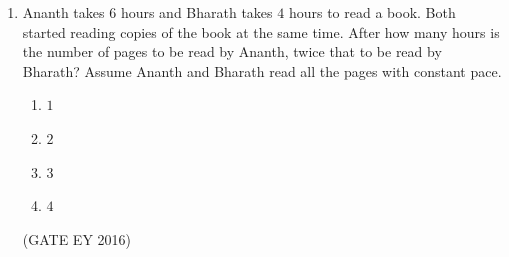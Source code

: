 \documentclass[journal]{IEEEtran}
\begin{document}
\begin{enumerate}[label=Q.\arabic*.]
\item Ananth takes $6$ hours and Bharath takes $4$ hours to read a book. Both started reading copies of the book at the same time. After how many hours is the number of pages to be read by Ananth, twice that to be read by Bharath? Assume Ananth and Bharath read all the pages with constant pace.
\begin{multicols}{4}
\begin{enumerate}
    \item $1$
    \item $2$
    \item $3$
    \item $4$
\end{enumerate}
\end{multicols}
\hfill{(GATE EY 2016)}

\end{enumerate}
\bigskip
{}

\clearpage
\end{document}
